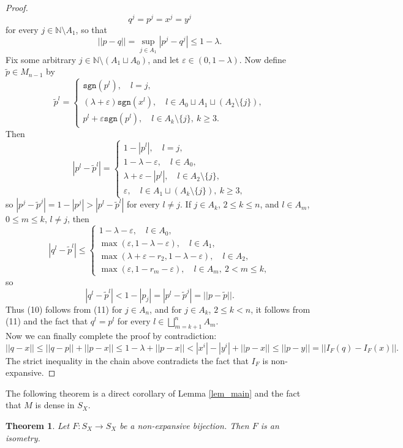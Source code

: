 \documentclass[reqno]{amsart}
\theoremstyle{plain}
\newtheorem{theorem}{Theorem}[section]
\theoremstyle{remark}
\theoremstyle{definition}
\newcommand{\N}{\mathbb N}
\begin{document}
\begin{proof}
\begin{equation}
       q^j=p^j=x^j=y^j
   \end{equation} 
    for every $j \in \N \setminus A_1$, so that 
    \begin{equation*}
        ||p-q||=\sup_{j\in A_1} |p^j-q^j|\leq 1-\lambda.
    \end{equation*}
    Fix some arbitrary $j \in \N \setminus (A_1 \sqcup A_0)$, and let $\varepsilon \in (0,1-\lambda)$. Now define $\tilde p \in M_{n-1}$ by 
    \[\tilde{p}^l=\begin{cases} \mathtt{sgn}(p^l) , \quad l=j,\\
    (\lambda+\varepsilon) \mathtt {sgn}(x^l), \quad l \in A_0 \sqcup A_1 \sqcup (A_2 \setminus  \{j\}),\\
    p^l + \varepsilon \mathtt{sgn}(p^l), \quad l \in A_k \setminus \{j\}, \ k \geq 3.
    \end{cases}\]
Then 
\[|p^l-\tilde{p} ^l|=\begin{cases} 1-|p^l| , \quad l=j,\\
   1- \lambda-\varepsilon , \quad l \in A_0 ,\\
    \lambda +\varepsilon -|p^l|, \quad l \in A_2 \setminus \{j\}, \\
    \varepsilon, \quad l \in A_1 \sqcup(A_k \setminus \{j\}), \ k \geq 3,
    \end{cases}\]
so $|p^j-\tilde{p}^j|=1-|p^j|>|p^l-\tilde{p} ^l|$ for every $l \neq j$. If $j \in A_k$, $2 \leq k \leq n$, and $l \in A_m$, $0 \leq m \leq k$, $l \neq j$, then 
\begin{equation*}
    |q^l-\tilde p ^l| \leq \begin{cases}
        1 - \lambda - \varepsilon, \quad l \in A_0,\\
        \max (\varepsilon, 1-\lambda-\varepsilon), \quad l \in A_1,\\
        \max(\lambda +\varepsilon -r_2, 1-\lambda-\varepsilon), \quad l \in A_2,\\
        \max(\varepsilon,1-r_m-\varepsilon), \quad l \in A_m, \ 2<m\leq k,
    \end{cases}
\end{equation*}
so
\begin{equation}
    |q^l-\tilde p^l|<1-|p_j|=|p^l-\tilde p^j|=||p-\tilde p||.
\end{equation}
Thus (10) follows from (11) for $j \in A_n$, and for $j \in A_k$, $2 \leq k <n$, it follows from (11) and the fact that $q^{l}=p^{l}$ for every $l \in \bigsqcup_{m=k+1}^nA_m$.\\
Now we can finally complete the proof by contradiction:
\[||q-x||\leq||q-p||+||p-x||\leq1-\lambda+||p-x||<|x^i|-|y^i|+||p-x|| \leq||p-y||=||I_F(q)-I_F(x)||.\]
   The strict inequality in the chain above contradicts the fact that $I_F$ is non-expansive.
\end{proof}
The following theorem is a direct corollary of Lemma \ref{lem_main} and the fact that $M$ is dense in $S_X$.
\begin{theorem}
    Let $F:S_X \rightarrow S_X$ be a non-expansive bijection.
    Then $F$ is an isometry.
\end{theorem}
\end{document}
